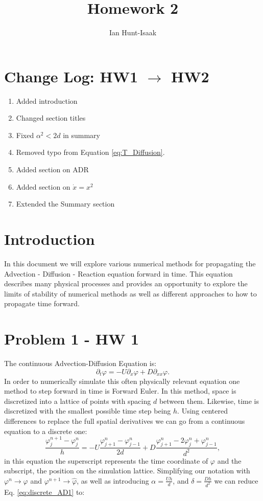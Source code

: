 \documentclass[]{article}
\title{Homework 2}
\author{Ian Hunt-Isaak}
\date{}
\begin{document}
\maketitle

\section{Change Log: HW1 $\to$ HW2}
\begin{enumerate}
	\item Added introduction
	\item Changed section titles
	\item Fixed $\alpha^2 < 2d$ in summary
	\item Removed typo from Equation \ref{eq:T_Diffusion}.
	\item Added section on ADR
	\item Added section on $\dot{x} = x^2$
	\item Extended the Summary section
\end{enumerate}
\section{Introduction}
In this document we will explore various numerical methods for propagating the Advection - Diffusion - Reaction equation forward in time. This equation describes many physical processes and provides an opportunity to explore the limits of stability of numerical methods as well as different approaches to how to propagate time forward. 

\section{Problem 1 - HW 1}
The continuous Advection-Diffusion Equation is:
\begin{equation}
\partial_t \varphi = -U \partial_x \varphi + D \partial_{xx}\varphi.
\label{eq:AD_cont}
\end{equation}
In order to numerically simulate this often physically relevant equation one method to step forward in time is Forward Euler. In this method, space is discretized into a lattice of points with spacing $d$ between them. Likewise, time is discretized with the smallest possible time step being $h$. Using centered differences to replace the full spatial derivatives we can go from a continuous equation to a discrete one:
\begin{equation}
\frac{\varphi^{n+1}_j-\varphi^n_j}{h} = -U \frac{\varphi^n_{j+1}-\varphi^n_{j-1}}{2d} + D \frac{\varphi^n_{j+1}-2\varphi^n_{j}+\varphi^n_{j-1}}{d^2},
\label{eq:discrete_AD1}
\end{equation}
in this equation the superscript represents the time coordinate of $\varphi$ and the subscript, the position on the simulation lattice. Simplifying our notation with $\varphi^n \to \varphi$ and $\varphi^{n+1} \to \hat{\varphi}$, as well as introducing $\alpha = \frac{Uh}{d}$, and $\delta=\frac{Dh}{d^2}$  we can reduce Eq. \ref{eq:discrete_AD1} to:
\end{document}
